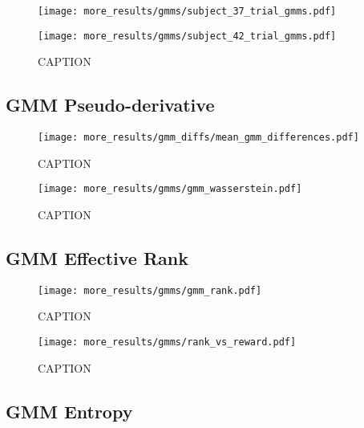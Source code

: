 \documentclass[../main.tex]{subfiles}
\begin{document}
\begin{figure}[H]
  \centering
  \begin{minipage}{0.49\textwidth}
    \texttt{[image: more\_results/gmms/subject\_37\_trial\_gmms.pdf]}
    \subcaption{}
  \end{minipage}%
  \begin{minipage}{0.49\textwidth}
    \texttt{[image: more\_results/gmms/subject\_42\_trial\_gmms.pdf]}
    \subcaption{}
  \end{minipage}
  \caption[Example trial GMMs for subjects 37 and 42]{CAPTION}\label{fig:example_trial_gmms}
\end{figure}


\subsection{GMM Pseudo-derivative}

\begin{figure}[H]
  \centering
    \texttt{[image: more\_results/gmm\_diffs/mean\_gmm\_differences.pdf]}
    \caption[Mean GMM differences over subjects]{CAPTION}\label{fig:gmm_diffs}
\end{figure}

\begin{figure}[H]
  \centering
    \texttt{[image: more\_results/gmms/gmm\_wasserstein.pdf]}
    \caption[Wasserstein distance between GMMs]{CAPTION}\label{fig:gmm_w2}
\end{figure}


\subsection{GMM Effective Rank}

\begin{figure}[H]
  \centering
    \texttt{[image: more\_results/gmms/gmm\_rank.pdf]}
    \caption[Effective rank of GMMs]{CAPTION}\label{fig:gmm_rank}
\end{figure}

\begin{figure}[H]
  \centering
    \texttt{[image: more\_results/gmms/rank\_vs\_reward.pdf]}
    \caption[Effective rank]{CAPTION}\label{fig:rank_vs_reward}
\end{figure}


\subsection{GMM Entropy}
\end{document}
